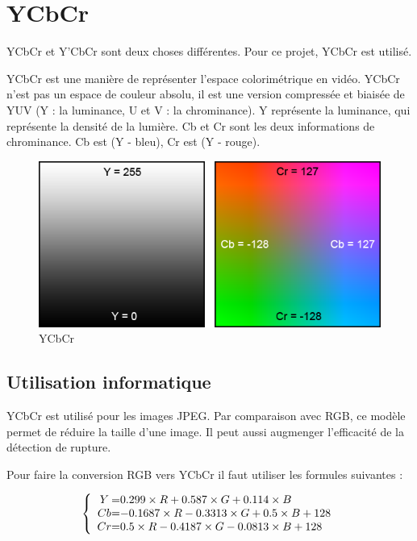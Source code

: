 \section{YCbCr}

YCbCr et Y’CbCr sont deux choses différentes. Pour ce projet, YCbCr est utilisé.

YCbCr est une manière de représenter l’espace colorimétrique en vidéo. YCbCr n’est pas un espace de couleur absolu, il est une version compressée et biaisée de YUV (Y : la luminance, U et V : la chrominance). Y représente la luminance, qui représente la densité de la lumière. Cb et Cr sont les deux informations de chrominance. Cb est (Y - bleu), Cr est (Y - rouge).

\begin{figure}[h!]
      \centering
      \includegraphics[scale=0.6]{images/YCbCr.png}
      \caption{\label{YCbCr}YCbCr}
\end{figure}


\subsection{Utilisation informatique}
YCbCr est utilisé pour les images JPEG. Par comparaison avec RGB, ce modèle permet de réduire la taille d’une image. Il peut aussi augmenger l’efficacité de la détection de rupture.

Pour faire la conversion RGB vers YCbCr il faut utiliser les formules suivantes :

\[
 \left \{
 \begin{array}{c @{=} l}
	Y & 0.299 \times R + 0.587 \times G + 0.114 \times B \\
	Cb & -0.1687 \times R - 0.3313 \times G + 0.5 \times B + 128 \\
	Cr & 0.5 \times R - 0.4187 \times G - 0.0813 \times B + 128 \\
 \end{array}
 \right.
\]


